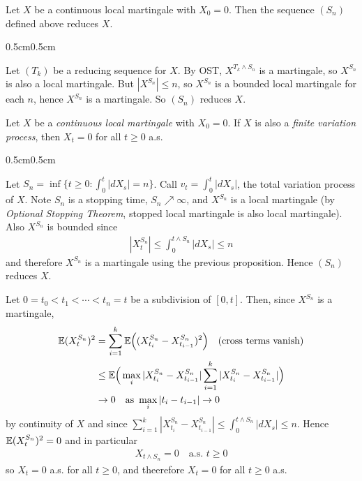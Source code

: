 \documentclass[12pt,a4paper]{article}
\newenvironment{proof}
{\begin{changemargin}{0.5cm}{0.5cm} 
	}%
	{\end{changemargin}
}
\newenvironment{p}
{\begin{proof} 
	}%
	{\end{proof}
}
\begin{document}
\prop Let $X$ be a continuous local martingale with $X_0 =0$. Then the sequence $(S_n)$ defined above reduces $X$.
\begin{p}
\pf Let $(T_k)$ be a reducing sequence for $X$. By OST, $X^{T_k \wedge S_n}$ is a martingale, so $X^{S_n}$ is also a local martingale. But $|X^{S_n}|\leq n$, so $X^{S_n}$ is a bounded local martingale for each $n$, hence $X^{S_n}$ is a martingale. So $(S_n)$ reduces $X$.

\eop
\end{p}
\s

\thm Let $X$ be a \emph{continuous local martingale} with $X_0 =0$. If $X$ is also a \emph{finite variation process}, then $X_t =0$ for all $t\geq 0$ a.s.
\begin{p}
\pf Let $S_n = \inf \{t\geq 0 : \int_0^t |dX_s| =n \}$. Call $v_t = \int_0^t |dX_s|$, the total variation process of $X$. Note $S_n$ is a stopping time, $S_n \nearrow \infty$, and $X^{S_n}$ is a local martingale (by \emph{Optional Stopping Theorem}, stopped local martingale is also local martingale). Also $X^{S_n}$ is bounded since 
\begin{align*}
|X_t^{S_n}| \leq \int_0^{t\wedge S_n} |dX_s| \leq n
\end{align*}
and therefore $X^{S_n}$ is a martingale using the previous proposition. Hence $(S_n)$ reduces $X$.

\quad Let $0=t_0 < t_1<\cdots < t_n =t$ be a subdivision of $[0,t]$. Then, since $X^{S_n}$ is a martingale,
\begin{align*}
\mathbb{E} (X_t^{S_n})^2 &= \sum_{i=1}^k \mathbb{E} \Big( (X_{t_i}^{S_n} - X_{t_{i-1}}^{S_n})^2\Big)\quad  \text{(cross terms vanish)} \\
&\leq \mathbb{E} \Big( \max_i |X_{t_i}^{S_n} - X_{t_{i-1}}^{S_n}| \sum_{i=1}^k |X_{t_i}^{S_n} - X_{t_{i-1}}^{S_n}|\Big) \\
&\rightarrow 0 \quad \text{as } \max_i |t_i - t_{i-1}| \rightarrow 0
\end{align*}
by continuity of $X$ and since $\sum_{i=1}^k |X_{t_i}^{S_n} - X_{t_{i-1}}^{S_n}| \leq \int_0^{t\wedge S_n} |dX_s| \leq n$. Hence $\mathbb{E} (X_t^{S_n})^2 =0$ and in particular
\begin{align*}
X_{t\wedge S_n} =0 \quad \text{a.s.} \,\, t\geq 0
\end{align*}
so $X_t =0$ a.s. for all $t\geq 0$, and theerefore $X_t =0$ for all $t\geq 0$ a.s.

\eop
\end{p}
\s

\newday
\end{document}
